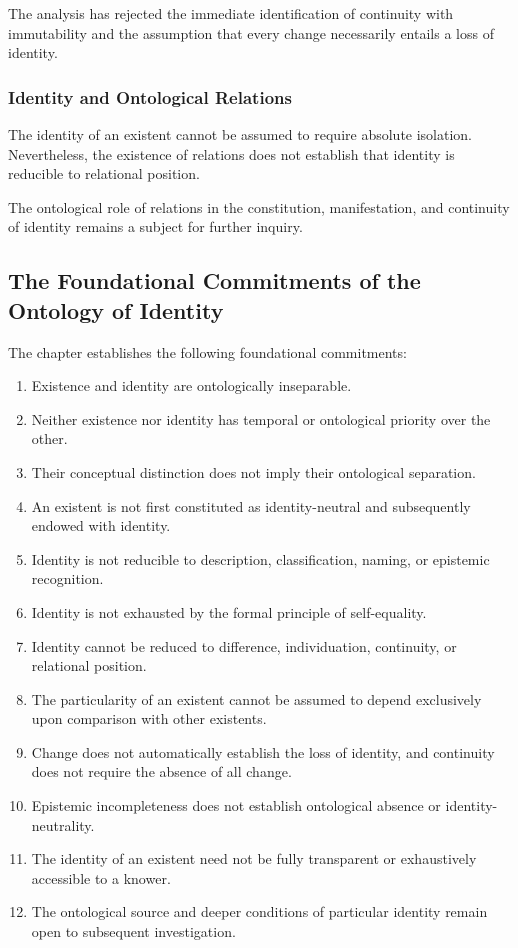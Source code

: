 The analysis has rejected the immediate identification of continuity with immutability and the assumption that every change necessarily entails a loss of identity.

\subsubsection{Identity and Ontological Relations}

The identity of an existent cannot be assumed to require absolute isolation. Nevertheless, the existence of relations does not establish that identity is reducible to relational position.

The ontological role of relations in the constitution, manifestation, and continuity of identity remains a subject for further inquiry.



\subsection{The Foundational Commitments of the Ontology of Identity}

The chapter establishes the following foundational commitments:

\begin{enumerate}
    \item Existence and identity are ontologically inseparable.
    \item Neither existence nor identity has temporal or ontological priority over the other.
    \item Their conceptual distinction does not imply their ontological separation.
    \item An existent is not first constituted as identity-neutral and subsequently endowed with identity.
    \item Identity is not reducible to description, classification, naming, or epistemic recognition.
    \item Identity is not exhausted by the formal principle of self-equality.
    \item Identity cannot be reduced to difference, individuation, continuity, or relational position.
    \item The particularity of an existent cannot be assumed to depend exclusively upon comparison with other existents.
    \item Change does not automatically establish the loss of identity, and continuity does not require the absence of all change.
    \item Epistemic incompleteness does not establish ontological absence or identity-neutrality.
    \item The identity of an existent need not be fully transparent or exhaustively accessible to a knower.
    \item The ontological source and deeper conditions of particular identity remain open to subsequent investigation.
\end{enumerate}

